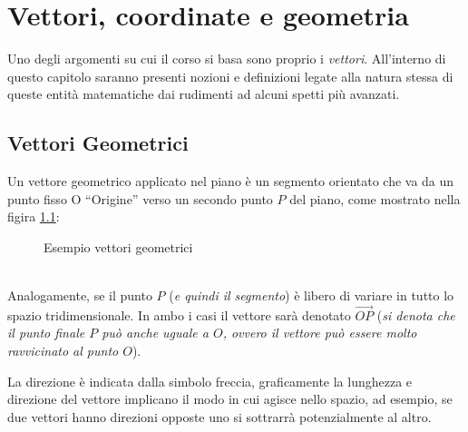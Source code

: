 \chapter{Vettori, coordinate e geometria}
\label{chap:vettcoordegeo}
Uno degli argomenti su cui il corso si basa sono proprio i \textit{vettori}. All'interno di questo capitolo saranno presenti nozioni e definizioni legate alla natura stessa di queste entità matematiche dai rudimenti ad alcuni spetti più avanzati.

\section{Vettori Geometrici}
\label{sec:vettorigeo}
\begin{defi}
  \label{def:vettorigeo}
  Un vettore geometrico applicato nel piano è un segmento orientato che va da un punto fisso O ``Origine'' verso un secondo punto $P$ del piano, come mostrato nella figira \ref{fig:vettorigeo}: 
  \begin{figure}[ht!]
    \centering
    \resizebox{3cm}{!}{
      
    }
    \caption{Esempio vettori geometrici}
    \label{fig:vettorigeo}
  \end{figure}\\
  Analogamente, se il punto $P$ (\textit{e quindi il segmento}) è libero di variare in tutto lo spazio tridimensionale. In ambo i casi il vettore sarà denotato $\vec{OP}$ (\textit{si denota che il punto finale $P$ può anche uguale a $O$, ovvero il vettore può essere molto ravvicinato al punto $O$}).
\end{defi}
\begin{nota}
  \label{nota:vettorigeo}
  La direzione è indicata dalla simbolo freccia, graficamente la lunghezza e direzione del vettore implicano il modo in cui agisce nello spazio, ad esempio, se due vettori hanno direzioni opposte uno si sottrarrà potenzialmente al altro.
\end{nota}

